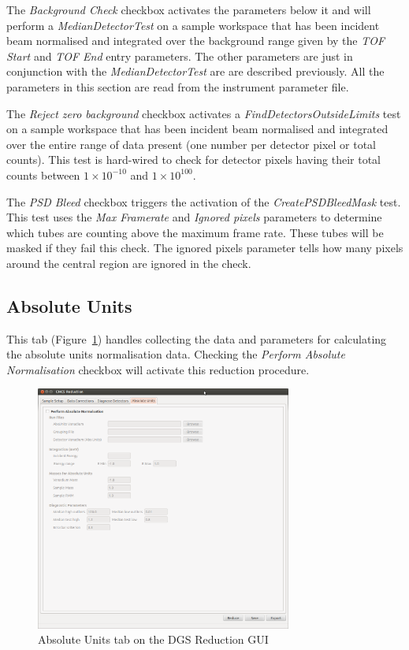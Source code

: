 The \textit{Background Check} checkbox activates the parameters below it and will perform a \textit{MedianDetectorTest} on a sample workspace that has been incident beam normalised and integrated over the background range given by the \textit{TOF Start} and \textit{TOF End} entry parameters. The other parameters are just in conjunction with the \textit{MedianDetectorTest} are are described previously. All the parameters in this section are read from the instrument parameter file.

The \textit{Reject zero background} checkbox activates a \textit{FindDetectorsOutsideLimits} test on a sample workspace that has been incident beam normalised and integrated over the entire range of data present (one number per detector pixel or total counts). This test is hard-wired to check for detector pixels having their total counts between $1\times10^{-10}$ and $1\times10^{100}$. 

The \textit{PSD Bleed} checkbox triggers the activation of the \textit{CreatePSDBleedMask} test.
This test uses the \textit{Max Framerate} and \textit{Ignored pixels} parameters to determine which tubes are counting above the maximum frame rate. These tubes will be masked if they fail this check. The ignored pixels parameter tells how many pixels around the central region are ignored in the check.
\subsection{Absolute Units}
This tab (Figure~\ref{fig:AbsUnits}) handles collecting the data and parameters for calculating the absolute units normalisation data. Checking the \textit{Perform Absolute Normalisation} checkbox will activate this reduction procedure. 

\begin{figure}[ht]
\centerline{\includegraphics[width=0.75\textwidth]{figures/AbsoluteUnits.png}}
\caption{Absolute Units tab on the DGS Reduction GUI}
\label{fig:AbsUnits}
\end{figure}

